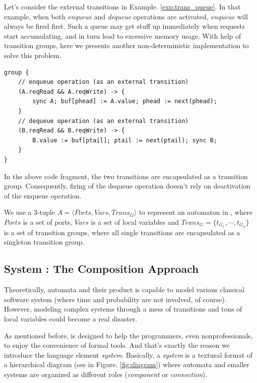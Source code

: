 \begin{example} Let's consider the external transitions in Example. \ref{exp:trans_queue}. In that example, when both \emph{enqueue} and \emph{dequeue} operations are activated, \emph{enqueue} will always be fired first. Such a queue may get stuff up immediately when requests start accumulating, and in turn lead to excessive memory usage. With help of transition groups, here we presents another non-deterministic implementation to solve this problem.
\begin{lstlisting}
group {
    // enqueue operation (as an external transition)
    (A.reqRead && A.reqWrite) -> {
        sync A; buf[phead] := A.value; phead := next(phead);
    }
    // dequeue operation (as an external transition)
    (B.reqRead && B.reqWrite) -> {
        B.value := buf[ptail]; ptail := next(ptail); sync B;
    }
}
\end{lstlisting}
In the above code fragment, the two transitions are encapsulated as a transition group. Consequently, firing of the dequeue operation doesn't rely on deactivation of the enqueue operation.
\label{exp:transgroup_queue}
\end{example}


We use a 3-tuple $A=\langle Ports, Vars, Trans_G \rangle$ to represent an automaton in \lang{}, where $Ports$ is a set of ports, $Vars$ is a set of local variables and $Trans_G=\{t_{G_1},\cdots,t_{G_n}\}$ is a set of transition groups, where all single transitions are encapsulated as a singleton transition group.

\subsection{System : The Composition Approach}
\label{subsec:system}

Theoretically, automata and their product is capable to model various classical software system (where time and probability are not involved, of course). However, modeling complex systems through a mess of transitions and tons of local variables could become a real disaster.

As mentioned before, \lang{} is designed to help the programmers, even nonprofessionals, to enjoy the convenience of formal tools. And that's exactly the reason we introduce the language element \emph{system}. Basically, a \emph{system} is a textural format of a hierarchical diagram (see in Figure. \ref{fig:diagram}) where automata and smaller systems are organized as different roles (\emph{component} or 
\emph{connection}). 

